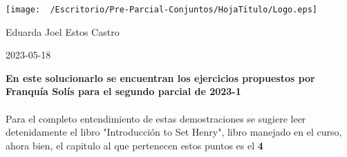 \documentclass{article}
\begin{document}
\begin{titlepage}
  \centering

  \vspace*{\fill}
  \texttt{[image: ~/Escritorio/Pre-Parcial-Conjuntos/HojaTitulo/Logo.eps]}\par\vspace{2cm}
  \par
  \vspace{0.2cm}

  \Large{Eduarda Joel Estos Castro\par}
  \vspace*{\fill}
  \normalsize 2023-05-18 
\end{titlepage}
\clearpage

\textbf{En este solucionarlo se encuentran los ejercicios propuestos por Franquía Solís para el segundo parcial de 2023-1}\\ 
\\ 
Para el completo entendimiento de estas demostraciones se sugiere leer detenidamente el libro "Introducción to Set Henry"\cite{Jech}, libro manejado en el curso, ahora bien, el capitulo al que pertenecen estos puntos es el \textbf{4}
\end{document}
